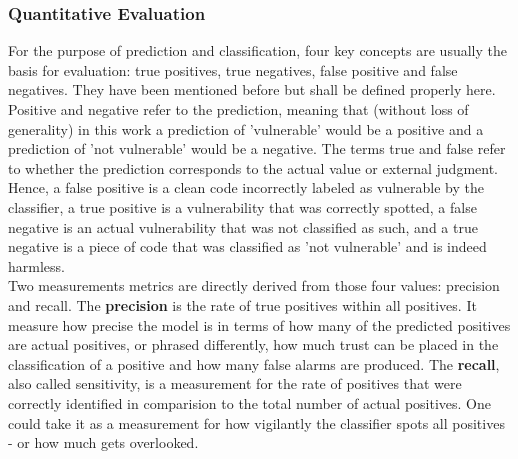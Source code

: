 \documentclass[
	a4paper,
	pagesize,
	pdftex,
	12pt,
	twoside, %
	BCOR=5mm, %
	ngerman,
	fleqn,
	final,
	]{scrartcl}
\begin{document}
\subsubsection{Quantitative Evaluation}\label{quantitative}
For the purpose of prediction and classification, four key concepts are usually the basis for evaluation: true positives, true negatives, false positive and false negatives. They have been mentioned before but shall be defined properly here. Positive and negative refer to the prediction, meaning that (without loss of generality) in this work a prediction of 'vulnerable' would be a positive and a prediction of 'not vulnerable' would be a negative. The terms true and false refer to whether the prediction corresponds to the actual value or external judgment. Hence, a false positive is a clean code incorrectly labeled as vulnerable by the classifier, a true positive is a vulnerability that was correctly spotted, a false negative is an actual vulnerability that was not classified as such, and a true negative is a piece of code that was classified as 'not vulnerable' and is indeed harmless.\\
Two measurements metrics are directly derived from those four values: precision and recall. The \textbf{precision} is the rate of true positives within all positives. It measure how precise the model is in terms of how many of the predicted positives are actual positives, or phrased differently, how much trust can be placed in the classification of a positive and how many false alarms are produced. The \textbf{recall}, also called sensitivity, is a measurement for the rate of positives that were correctly identified in comparision to the total number of actual positives. One could take it as a measurement for how vigilantly the classifier spots all positives - or how much gets overlooked.\newline
\end{document}
